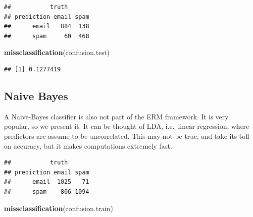 \documentclass[]{book}
\newenvironment{Shaded}{\begin{snugshade}}{\end{snugshade}}
\newcommand{\KeywordTok}[1]{\textcolor[rgb]{0.13,0.29,0.53}{\textbf{#1}}}
\newcommand{\DataTypeTok}[1]{\textcolor[rgb]{0.13,0.29,0.53}{#1}}
\newcommand{\DecValTok}[1]{\textcolor[rgb]{0.00,0.00,0.81}{#1}}
\newcommand{\StringTok}[1]{\textcolor[rgb]{0.31,0.60,0.02}{#1}}
\newcommand{\CommentTok}[1]{\textcolor[rgb]{0.56,0.35,0.01}{\textit{#1}}}
\newcommand{\OperatorTok}[1]{\textcolor[rgb]{0.81,0.36,0.00}{\textbf{#1}}}
\newcommand{\NormalTok}[1]{#1}
\theoremstyle{definition}
\theoremstyle{definition}
\theoremstyle{definition}
\theoremstyle{remark}
\begin{document}
\begin{verbatim}
##           truth
## prediction email spam
##      email   884  138
##      spam     60  468
\end{verbatim}

\begin{Shaded}
\begin{Highlighting}[]
\KeywordTok{missclassification}\NormalTok{(confusion.test)}
\end{Highlighting}
\end{Shaded}

\begin{verbatim}
## [1] 0.1277419
\end{verbatim}

\subsection{Naive Bayes}\label{naive-bayes}

A Naive-Bayes classifier is also not part of the ERM framework. It is
very popular, so we present it. It can be thought of LDA, i.e.~linear
regression, where predictors are assume to be uncorrelated. This may not
be true, and take its toll on accuracy, but it makes computations
extremely fast.

\begin{Shaded}
\end{Shaded}

\begin{verbatim}
##           truth
## prediction email spam
##      email  1025   71
##      spam    806 1094
\end{verbatim}

\begin{Shaded}
\begin{Highlighting}[]
\KeywordTok{missclassification}\NormalTok{(confusion.train)}
\end{Highlighting}
\end{Shaded}
\end{document}
